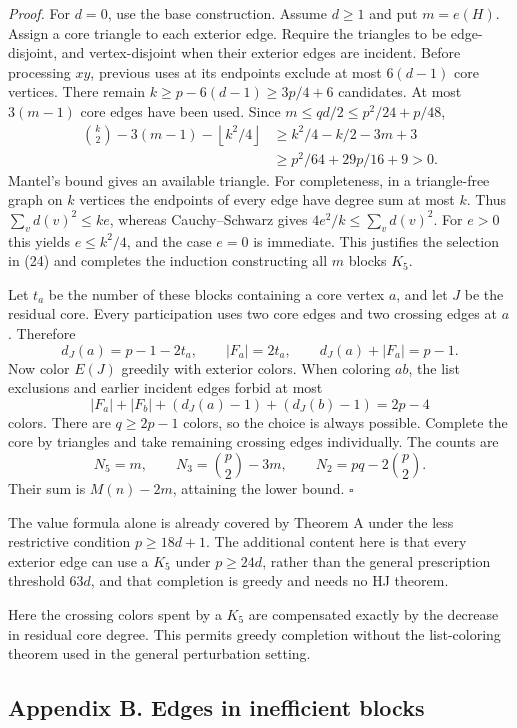 \documentclass[english,11pt,a4paper]{article}
\begin{document}
\emph{Proof.} For \(d=0\), use the base construction. Assume \(d\ge1\)
and put \(m=e(H)\). Assign a core triangle to each exterior edge.
Require the triangles to be edge-disjoint, and vertex-disjoint when
their exterior edges are incident. Before processing \(xy\), previous
uses at its endpoints exclude at most \(6(d-1)\) core vertices. There
remain \(k\ge p-6(d-1)\ge3p/4+6\) candidates. At most \(3(m-1)\) core
edges have been used. Since \(m\le qd/2\le p^2/24+p/48\), \[
\begin{aligned}
\binom k2-3(m-1)-\left\lfloor k^2/4\right\rfloor
&\ge k^2/4-k/2-3m+3\\
&\ge p^2/64+29p/16+9>0.
\end{aligned} \tag{24}
\] Mantel's bound gives an available triangle. For completeness, in a
triangle-free graph on \(k\) vertices the endpoints of every edge have
degree sum at most \(k\). Thus \(\sum_v d(v)^2\le ke\), whereas
Cauchy--Schwarz gives \(4e^2/k\le\sum_v d(v)^2\). For \(e>0\) this
yields \(e\le k^2/4\), and the case \(e=0\) is immediate. This justifies
the selection in (24) and completes the induction constructing all \(m\)
blocks \(K_5\).

Let \(t_a\) be the number of these blocks containing a core vertex
\(a\), and let \(J\) be the residual core. Every participation uses two
core edges and two crossing edges at \(a\). Therefore \[
d_J(a)=p-1-2t_a,\qquad |F_a|=2t_a,
\qquad d_J(a)+|F_a|=p-1. \tag{25}
\] Now color \(E(J)\) greedily with exterior colors. When coloring
\(ab\), the list exclusions and earlier incident edges forbid at most \[
|F_a|+|F_b|+(d_J(a)-1)+(d_J(b)-1)=2p-4
\] colors. There are \(q\ge2p-1\) colors, so the choice is always
possible. Complete the core by triangles and take remaining crossing
edges individually. The counts are \[
N_5=m,\qquad N_3=\binom p2-3m,\qquad N_2=pq-2\binom p2.
\] Their sum is \(M(n)-2m\), attaining the lower bound. \(\square\)

The value formula alone is already covered by Theorem A under the less
restrictive condition \(p\ge18d+1\). The additional content here is that
every exterior edge can use a \(K_5\) under \(p\ge24d\), rather than the
general prescription threshold \(63d\), and that completion is greedy
and needs no HJ theorem.

Here the crossing colors spent by a \(K_5\) are compensated exactly by
the decrease in residual core degree. This permits greedy completion
without the list-coloring theorem used in the general perturbation
setting.

\subsection{Appendix B. Edges in inefficient
blocks}\label{appendix-b.-edges-in-inefficient-blocks}
\end{document}
